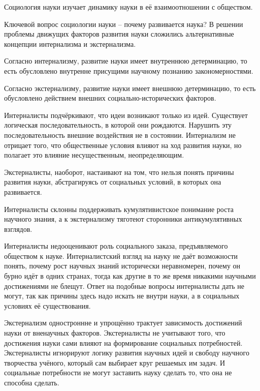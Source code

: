 \documentclass[exam_answers.tex]{subfiles}
\begin{document}
\renewcommand{\baselinestretch}{0.75}

Социология науки изучает динамику науки в её взаимоотношении с обществом.

Ключевой вопрос социологии науки – почему развивается наука?
В решении проблемы движущих факторов развития науки сложились альтернативные концепции интернализма и экстернализма.

Согласно интернализму, развитие науки имеет внутреннюю детерминацию, то есть обусловлено внутренне присущими научному познанию закономерностями.

Согласно экстернализму, развитие науки имеет внешнюю детерминацию, то есть обусловлено действием внешних социально-исторических факторов.

Интерналисты подчёркивают, что идеи возникают только из идей.
Существует логическая последовательность, в которой они рождаются. Нарушить эту последовательность внешние воздействия не в состоянии.
Интернализм не отрицает того, что общественные условия влияют на ход развития науки, но полагает это влияние несущественным, неопределяющим.

Экстерналисты, наоборот, настаивают на том, что нельзя понять причины развития науки, абстрагируясь от социальных условий, в которых она развивается.

Интерналисты склонны поддерживать кумулятивистское понимание роста научного знания, а к экстернализму тяготеют сторонники антикумулятивных взглядов.

Интерналисты недооценивают роль социального заказа, предъявляемого обществом к науке. Интерналистский взгляд на науку не даёт возможности понять, почему рост научных знаний исторически неравномерен, почему он бурно идёт в одних странах, тогда как другие в то же время никакими научными достижениями не блещут.
Ответ на подобные вопросы интерналисты дать не могут, так как причины здесь надо искать не внутри науки, а в социальных условиях её существования.

Экстернализм одностроннне и упрощённо трактует зависимость достижений науки от вненаучных факторов.
Экстерналисты не учитывают того, что достижения науки сами влияют на формирование социальных потребностей.
Экстерналисты игнорируют логику развития научных идей и свободу научного творчества учёного, который сам выбирает круг решаемых им задач.
И социальные потребности не могут заставить науку сделать то, что она не способна сделать.
\end{document}
